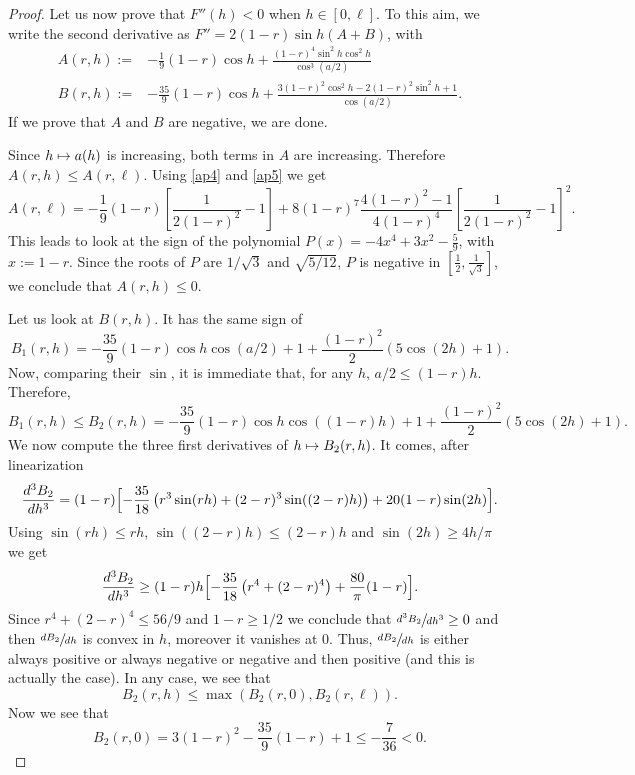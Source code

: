 \documentclass[11pt]{article}
\numberwithin{equation}{section}
\newcommand\mto{\mathchoice{\longmapsto}{\mapsto}{\mapsto}{\mapsto}}
\theoremstyle{plain}
\theoremstyle{definition}
\begin{document}
\begin{proof}
Let us now prove that $F''(h)<0$ when $h\in [0,\ell]$. To this aim, we write the second derivative as $F''=2(1-r)\sin h (A+B)$, with
\begin{align*}
A(r,h):=& -\frac{1}{9} (1-r) \cos h + \frac{(1-r)^4\sin^2 h \cos^2 h}{\cos^3(a/2)}
\\
B(r,h):=& -\frac{35}{9} (1-r)\cos h + \frac{3(1-r)^2\cos^2 h - 2 (1-r)^2\sin^2 h + 1}{\cos(a/2)}.
\end{align*}
If we prove that $A$ and $B$ are negative, we are done.

Since $h\mto a(h)$ is increasing, both terms in $A$ are increasing. Therefore
$A(r,h)\leq A(r,\ell)$. Using \eqref{ap4} and \eqref{ap5} we get
\[
A(r,\ell)=-\frac{1}{9}(1-r)\left[\frac{1}{2(1-r)^2}-1\right]+8(1-r)^7
\frac{4(1-r)^2-1}{4(1-r)^4}
\left[\frac{1}{2(1-r)^2}-1\right]^2.
\]
This leads to look at the sign of
the polynomial $P(x)=-4x^4+3x^2-\frac{5}{9}$, with $x:=1-r$. Since the roots of $P$
are $1/\sqrt{3}$ and $\sqrt{5/12}$, $P$ is negative in $[\frac{1}{2},\frac{1}{\sqrt{3}}]$, we conclude that $A(r,h)\leq 0$.

Let us look at $B(r,h)$. It has the same sign of\vspace*{-3pt}
\[
B_1(r,h)=-\frac{35}{9} (1-r)\cos h \cos(a/2) + 1 +\frac{(1-r)^2}{2}(5\cos(2h) +1).
\]
Now, comparing their $\sin$, it is immediate that, for any $h$, $a/2\leq (1-r)h$.
Therefore,
\[
B_1(r,h)\leq B_2(r,h)= -\frac{35}{9} (1-r)\cos h \cos((1-r)h) + 1 +\frac{(1-r)^2}{2}(5\cos(2h) +1).
\]
We now compute the three first derivatives of $h\mto B_2(r,h)$. It comes, after
linearization\vspace*{-3pt}
\[
\frac{d^3 B_2}{dh^3}=(1-r)\Bigl[-\frac{35}{18}\left(r^3\sin(rh)+(2-r)^3\sin((2-r)h)\right)
+20(1-r)\sin(2h)\Bigr].
\]
Using $\sin(rh)\leq rh$, $\sin((2-r)h)\leq (2-r)h$ and $\sin(2h)\geq 4h/\pi$
we get
\[
\frac{d^3 B_2}{d h^3}\geq (1-r)h\Bigl[-\frac{35}{18}\left(r^4+(2-r)^4\right)
+\frac{80}{\pi}(1-r)\Bigr].
\]
Since $r^4+(2-r)^4\leq 56/9$ and $1-r\geq 1/2$ we conclude that
$\sfrac{d^3 B_2}{dh^3} \geq 0$ and then $\sfrac{d B_2}{dh}$ is convex in $h$,
moreover it vanishes at $0$. Thus, $\sfrac{d B_2}{dh}$ is either always positive or always
negative or negative and then positive (and this is actually the case).
In any case, we see that\vspace*{-3pt}
\[
B_2(r,h)\leq \max\left(B_2(r,0),B_2(r,\ell)\right).
\]
Now we see that\vspace*{-3pt}
\[
B_2(r,0)=3(1-r)^2-\frac{35}{9}(1-r)+1 \leq -\frac{7}{36} <0.
\]


\end{proof}
\end{document}

